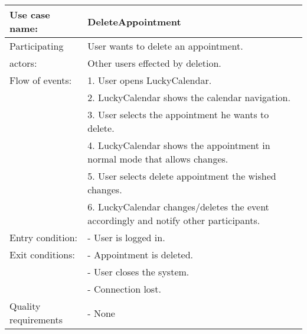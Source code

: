 {\tabulinesep=1.2mm
\begin{tabu}{ | p{3cm} | p{13cm} |}
    \hline
    Use case name: 			& 		DeleteAppointment\\ \hline
    Participating  			& 		User wants to delete an appointment. \\
    actors:					&		Other users effected by deletion.\\ \hline
    Flow of events: 		& 		1. User opens LuckyCalendar. \\
							&		2. LuckyCalendar shows the calendar navigation.\\
							&		3. User selects the appointment he wants to delete.\\
							&		4. LuckyCalendar shows the appointment in normal mode that allows changes.\\
							&		5. User selects delete appointment the wished changes.\\
							&		6. LuckyCalendar changes/deletes the event accordingly and notify other participants.\\\hline
    Entry condition: 		& 		- User is logged in.  \\ \hline
	Exit conditions: 		&		- Appointment is deleted.\\
							&		- User closes the system.\\
							&		- Connection lost.\\\hline
	Quality requirements	&	 	- None \\\hline
\end{tabu}
}